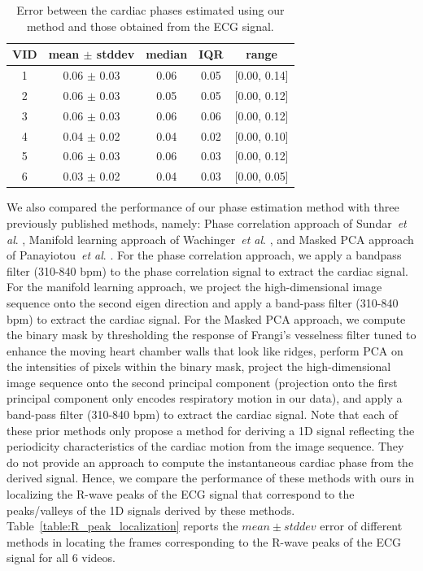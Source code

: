 \documentclass[journal]{IEEEtran}
\newcommand{\etal}{~\textit{et al}. }
\begin{document}
%	
\begin{table}[h]
\begin{minipage}[t]{0.95\linewidth}
\centering
\caption{Error between the cardiac phases estimated using our method and those obtained from the ECG signal.}
\begin{tabular}{|c|c|c|c|c|}
\hline
VID & mean $\pm$ stddev & median & IQR & range \\ \hline
1 & 0.06 $\pm$ 0.03 & 0.06 & 0.05 & {[}0.00, 0.14{]} \\ \hline
2 & 0.06 $\pm$ 0.03 & 0.05 & 0.05 & {[}0.00, 0.12{]} \\ \hline
3 & 0.06 $\pm$ 0.03 & 0.06 & 0.06 & {[}0.00, 0.12{]} \\ \hline
4 & 0.04 $\pm$ 0.02 & 0.04 & 0.02 & {[}0.00, 0.10{]} \\ \hline
5 & 0.06 $\pm$ 0.03 & 0.06 & 0.03 & {[}0.00, 0.12{]} \\ \hline
6 & 0.03 $\pm$ 0.02 & 0.04 & 0.03 & {[}0.00, 0.05{]} \\ \hline
\end{tabular}
\label{table:phase_estimation_error}
\end{minipage}
\end{table}	
%	
	
	We also compared the performance of our phase estimation method with three previously published methods, namely: Phase correlation approach of Sundar\etal\cite{Sundar2009}, Manifold learning approach of Wachinger\etal\cite{Wachinger2012}, and Masked PCA approach of Panayiotou\etal\cite{Panayiotou2014}. For the phase correlation approach, we apply a bandpass filter (310-840 bpm) to the phase correlation signal to extract the cardiac signal. For the manifold learning approach, we project the high-dimensional image sequence onto the second eigen direction and apply a band-pass filter (310-840 bpm) to extract the cardiac signal. For the Masked PCA approach, we compute the binary mask by thresholding the response of Frangi's vesselness filter tuned to enhance the moving heart chamber walls that look like ridges, perform PCA on the intensities of pixels within the binary mask,  project the high-dimensional image sequence onto the second principal component (projection onto the first principal component only encodes respiratory motion in our data), and apply a band-pass filter (310-840 bpm) to extract the cardiac signal. Note that each of these prior methods only propose a method for deriving a 1D signal reflecting the periodicity characteristics of the cardiac motion from the image sequence. They do not provide an approach to compute the instantaneous cardiac phase from the derived signal. Hence, we compare the performance of these methods with ours in localizing the R-wave peaks of the ECG signal that correspond to the peaks/valleys of the 1D signals derived by these methods. Table~\ref{table:R_peak_localization} reports the $mean \pm stddev$ error of different methods in locating the frames corresponding to the R-wave peaks of the ECG signal for all 6 videos. 
	
\end{document}
